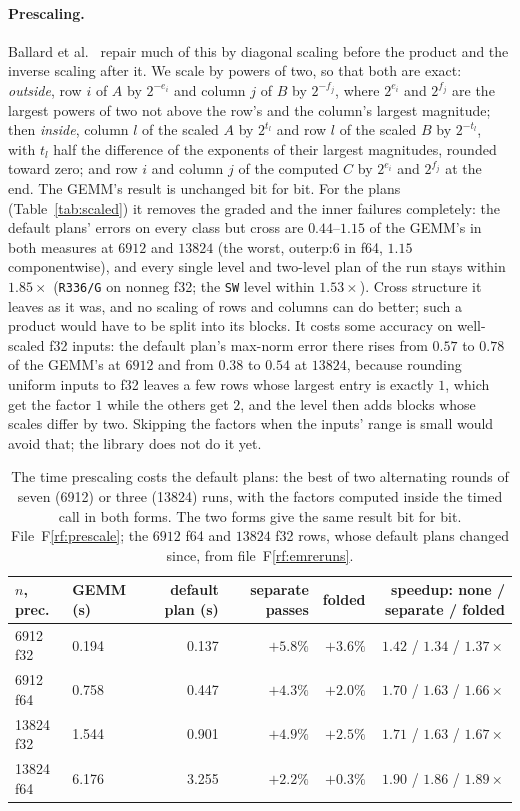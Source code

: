 \documentclass[11pt]{article}
\newcommand{\rf}[1]{F\ref{rf:#1}}
\newcommand{\lv}[1]{\texttt{#1}}
\begin{document}
\paragraph{Prescaling.}
Ballard et al.\ \cite{BBDLS16} repair much of this by diagonal scaling
before the product and the inverse scaling after it.  We scale by powers of
two, so that both are exact: \emph{outside}, row $i$ of $A$ by $2^{-e_i}$ and
column $j$ of $B$ by $2^{-f_j}$, where $2^{e_i}$ and $2^{f_j}$ are the
largest powers of two not above the row's and the column's largest
magnitude; then \emph{inside}, column $l$ of the scaled $A$ by $2^{t_l}$ and
row $l$ of the scaled $B$ by $2^{-t_l}$, with $t_l$ half the difference of
the exponents of their largest magnitudes, rounded toward zero; and row $i$
and column $j$ of the computed $C$ by $2^{e_i}$ and $2^{f_j}$ at the end.
The GEMM's result is unchanged bit for bit.  For the plans
(Table~\ref{tab:scaled}) it removes the graded and the inner failures
completely: the default plans' errors on every class but cross are
$0.44$--$1.15$ of the GEMM's in both measures at $6912$ and $13824$ (the
worst, outerp:6 in f64, $1.15$ componentwise), and every single level and
two-level plan of the run stays within $1.85\times$ (\lv{R336/G} on nonneg
f32; the \lv{SW} level within $1.53\times$).
Cross structure it leaves as it was, and no scaling of rows and columns can
do better; such a product would have to be split into its blocks.  It costs
some accuracy on well-scaled f32 inputs: the default plan's max-norm error there rises
from $0.57$ to $0.78$ of the GEMM's at $6912$ and from $0.38$ to $0.54$ at
$13824$, because rounding uniform inputs to f32 leaves a few rows whose
largest entry is exactly $1$, which get the factor $1$ while the others get
$2$, and the level then adds blocks whose scales differ by two.  Skipping the
factors when the inputs' range is small would avoid that; the library does
not do it yet.

\begin{table}[!tbp]
\centering\footnotesize
\begin{tabular}{llrrrr}
\toprule
$n$, prec. & GEMM (s) & default plan (s) & separate passes & folded & speedup: none / separate / folded\\
\midrule
6912 f32  & 0.194 & 0.137 & $+5.8\%$ & $+3.6\%$ & $1.42$ / $1.34$ / $1.37\times$\\
6912 f64  & 0.758 & 0.447 & $+4.3\%$ & $+2.0\%$ & $1.70$ / $1.63$ / $1.66\times$\\
13824 f32 & 1.544 & 0.901 & $+4.9\%$ & $+2.5\%$ & $1.71$ / $1.63$ / $1.67\times$\\
13824 f64 & 6.176 & 3.255 & $+2.2\%$ & $+0.3\%$ & $1.90$ / $1.86$ / $1.89\times$\\
\bottomrule
\end{tabular}
\caption{The time prescaling costs the default plans: the best of two
alternating rounds of seven (6912) or three (13824) runs, with the factors
computed inside the timed call in both forms.  The two forms give the same
result bit for bit.  File~\rf{prescale}; the $6912$ f64 and $13824$ f32 rows, whose default plans changed since, from file~\rf{emreruns}.}
\label{tab:prescale}
\end{table}
\end{document}
